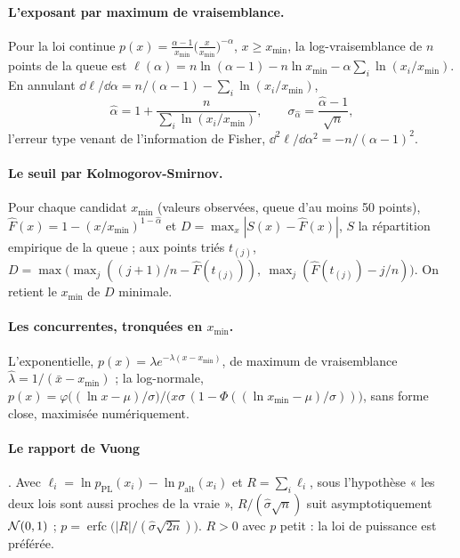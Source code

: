 \paragraph{L'exposant par maximum de vraisemblance.} Pour la loi continue $p(x) = \frac{\alpha - 1}{x_{\min}}\bigl(\frac{x}{x_{\min}}\bigr)^{-\alpha}$, $x \ge x_{\min}$, la log-vraisemblance de $n$ points de la queue est $\ell(\alpha) = n\ln(\alpha - 1) - n\ln x_{\min} - \alpha\sum_i \ln(x_i/x_{\min})$. En annulant $\dd\ell/\dd\alpha = n/(\alpha - 1) - \sum_i\ln(x_i/x_{\min})$,
\begin{equation}\label{t3spe:eq:alpha}
\hat\alpha = 1 + \frac{n}{\sum_i \ln(x_i/x_{\min})}, \qquad \sigma_{\hat\alpha} = \frac{\hat\alpha - 1}{\sqrt n},
\end{equation}
l'erreur type venant de l'information de Fisher, $\dd^2\ell/\dd\alpha^2 = -n/(\alpha - 1)^2$.

\paragraph{Le seuil par Kolmogorov-Smirnov.} Pour chaque candidat $x_{\min}$ (valeurs observées, queue d'au moins 50 points), $\hat F(x) = 1 - (x/x_{\min})^{1-\hat\alpha}$ et $D = \max_x|S(x) - \hat F(x)|$, $S$ la répartition empirique de la queue ; aux points triés $t_{(j)}$, $D = \max\bigl(\max_j ((j+1)/n - \hat F(t_{(j)})),\ \max_j (\hat F(t_{(j)}) - j/n)\bigr)$. On retient le $x_{\min}$ de $D$ minimale.

\paragraph{Les concurrentes, tronquées en $x_{\min}$.} L'exponentielle, $p(x) = \lambda e^{-\lambda(x - x_{\min})}$, de maximum de vraisemblance $\hat\lambda = 1/(\bar x - x_{\min})$ ; la log-normale, $p(x) = \varphi\bigl((\ln x - \mu)/\sigma\bigr)/\bigl(x\sigma\,(1 - \Phi((\ln x_{\min} - \mu)/\sigma))\bigr)$, sans forme close, maximisée numériquement.

\paragraph{Le rapport de Vuong} \cite{vuong1989likelihood}. Avec $\ell_i = \ln p_{\mathrm{PL}}(x_i) - \ln p_{\mathrm{alt}}(x_i)$ et $R = \sum_i \ell_i$, sous l'hypothèse « les deux lois sont aussi proches de la vraie », $R/(\hat\sigma\sqrt n)$ suit asymptotiquement $\mathcal{N}(0, 1)$ ; $p = \operatorname{erfc}\bigl(|R|/(\hat\sigma\sqrt{2n})\bigr)$. $R > 0$ avec $p$ petit : la loi de puissance est préférée.

